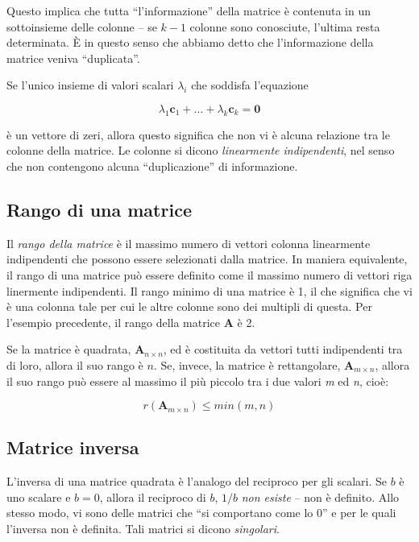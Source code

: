 \documentclass[
  11pt,
]{krantz}
\theoremstyle{definition}
\theoremstyle{definition}
\theoremstyle{definition}
\theoremstyle{definition}
\theoremstyle{remark}
\begin{document}
Questo implica che tutta ``l'informazione'' della matrice è contenuta in un sottoinsieme delle colonne -- se \(k-1\) colonne sono conosciute, l'ultima resta determinata. È in questo senso che abbiamo detto che l'informazione della matrice veniva ``duplicata''.

Se l'unico insieme di valori scalari \(\lambda_i\) che soddisfa l'equazione

\[\lambda_1 \boldsymbol{c}_1 + \dots + \lambda_k \boldsymbol{c}_k=\boldsymbol{0}\]

è un vettore di zeri, allora questo significa che non vi è alcuna relazione tra le colonne della matrice. Le colonne si dicono \emph{linearmente indipendenti}, nel senso che non contengono alcuna ``duplicazione'' di informazione.

\hypertarget{rango-di-una-matrice}{%
\subsection{Rango di una matrice}\label{rango-di-una-matrice}}

Il \emph{rango della matrice} è il massimo numero di vettori colonna linearmente indipendenti che possono essere selezionati dalla matrice. In maniera equivalente, il rango di una matrice può essere definito come il massimo numero di vettori riga linermente indipendenti. Il rango minimo di una matrice è 1, il che significa che vi è una colonna tale per cui le altre colonne sono dei multipli di questa. Per l'esempio precedente, il rango della matrice \(\boldsymbol{A}\) è 2.

Se la matrice è quadrata, \(\boldsymbol{A}_{n \times n}\), ed è costituita da vettori tutti indipendenti tra di loro, allora il suo rango è \(n\). Se, invece, la matrice è rettangolare, \(\boldsymbol{A}_{m \times n}\), allora il suo rango può essere al massimo il più piccolo tra i due valori \emph{m} ed \emph{n}, cioè:

\[r(\boldsymbol{A}_{m \times n}) \leq min(m,n)\]

\hypertarget{matrice-inversa}{%
\subsection{Matrice inversa}\label{matrice-inversa}}

L'inversa di una matrice quadrata è l'analogo del reciproco per gli scalari. Se \(b\) è uno scalare e \(b=0\), allora il reciproco di \(b\), \(1/b\) \emph{non esiste} -- non è definito. Allo stesso modo, vi sono delle matrici che ``si comportano come lo 0'' e per le quali l'inversa non è definita. Tali matrici si dicono \emph{singolari}.
\end{document}
